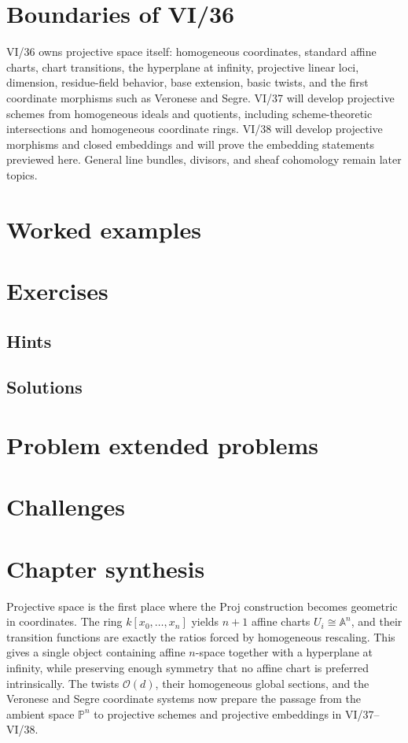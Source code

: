 \section{Boundaries of VI/36}
VI/36 owns projective space itself: homogeneous coordinates, standard affine charts, chart transitions, the hyperplane at infinity, projective linear loci, dimension, residue-field behavior, base extension, basic twists, and the first coordinate morphisms such as Veronese and Segre.  VI/37 will develop projective schemes from homogeneous ideals and quotients, including scheme-theoretic intersections and homogeneous coordinate rings.  VI/38 will develop projective morphisms and closed embeddings and will prove the embedding statements previewed here.  General line bundles, divisors, and sheaf cohomology remain later topics.

\section{Worked examples}


\section{Exercises}

\subsection*{Hints}

\subsection*{Solutions}


\section{Problem extended problems}


\section{Challenges}


\section*{Chapter synthesis}
Projective space is the first place where the Proj construction becomes geometric in coordinates.  The ring \(k[x_0,\ldots,x_n]\) yields \(n+1\) affine charts \(U_i\cong\mathbb A^n\), and their transition functions are exactly the ratios forced by homogeneous rescaling.  This gives a single object containing affine \(n\)-space together with a hyperplane at infinity, while preserving enough symmetry that no affine chart is preferred intrinsically.  The twists \(\mathcal O(d)\), their homogeneous global sections, and the Veronese and Segre coordinate systems now prepare the passage from the ambient space \(\mathbb P^n\) to projective schemes and projective embeddings in VI/37--VI/38.
